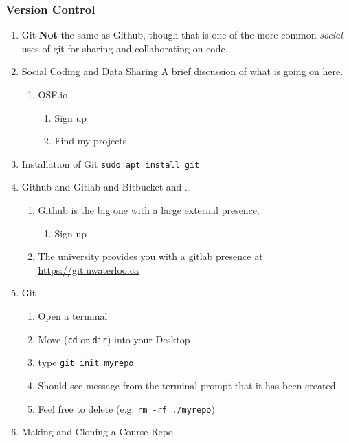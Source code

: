 \documentclass{article}
\begin{document}
\subsubsection{Version Control}
\label{sec:orga163c6c}
\begin{enumerate}
\item Git
\label{sec:org4ebbbcf}
\textbf{\textbf{Not}} the same as Github, though that is one of the more common \emph{social} uses of git for sharing and collaborating on code. 
\item Social Coding and Data Sharing
\label{sec:orgc2902a4}
A brief discussion of what is going on here.
\begin{enumerate}
\item OSF.io
\label{sec:org3f952e2}
\begin{enumerate}
\item Sign up
\item Find my projects
\end{enumerate}
\end{enumerate}
\item Installation of Git
\label{sec:orgb0090b4}
\texttt{sudo apt install git}
\item Github and Gitlab and Bitbucket and \ldots{}
\label{sec:orgf31a41b}
\begin{enumerate}
\item Github is the big one with a large external presence.
\begin{enumerate}
\item Sign-up
\end{enumerate}
\item The university provides you with a gitlab presence at \url{https://git.uwaterloo.ca}
\end{enumerate}
\item Git
\label{sec:orgfbb6e5a}
\begin{enumerate}
\item Open a terminal
\item Move (\texttt{cd} or \texttt{dir}) into your Desktop
\item type \texttt{git init myrepo}
\item Should see message from the terminal prompt that it has been created.
\item Feel free to delete (e.g. \texttt{rm -rf ./myrepo})
\end{enumerate}
\item Making and Cloning a Course Repo
\label{sec:org3b21487}
\begin{enumerate}

\end{enumerate}
\end{enumerate}
\end{document}
